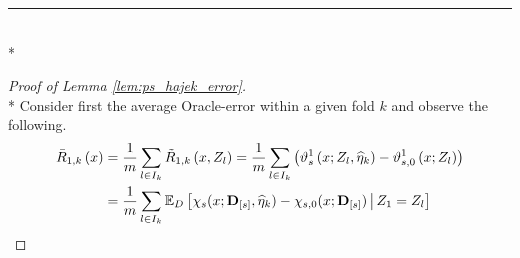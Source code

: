 \hrule

\begin{lem}\label{lem:ps_hajek_error}\mbox{}\\*
    
\end{lem}

\begin{proof}[Proof of Lemma \ref{lem:ps_hajek_error}]\mbox{}\\*
    Consider first the average Oracle-error within a given fold $k$ and observe the following.
    \begin{equation}
        \begin{aligned}
            \bar{R}_{1, k}\left(x\right)
            & = \frac{1}{m}\sum_{l \in I_{k}}\tilde{R}_{1, k}\left(x, Z_{l}\right)
            = \frac{1}{m}\sum_{l \in I_{k}}
            \left(\vartheta_{s}^{1}\left(x; Z_l, \hat{\eta}_{k}\right)
            - \vartheta_{s,0}^{1}\left(x; Z_l\right) 
            \right)\\
            & = \frac{1}{m}\sum_{l \in I_{k}}
            \E_{D}\left[\chi_{s}(x; \mathbf{D}_{[s]}, \hat{\eta}_{k}) - \chi_{s,0}(x; \mathbf{D}_{[s]})\, \middle| \, Z_1 = Z_l \right]
        \end{aligned}

\end{equation}
\end{proof}
